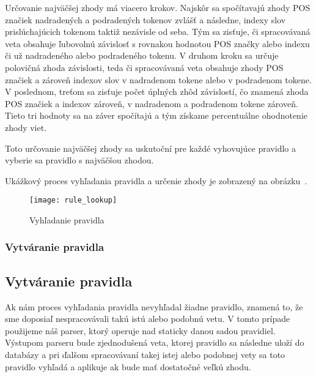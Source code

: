 Určovanie najväčšej zhody má viacero krokov. Najskôr sa spočítavajú zhody POS značiek nadradených a podradených tokenov zvlášť a následne, indexy slov prislúchajúcich tokenom taktiž nezávisle od seba. Tým sa zisťuje, či spracovávaná veta obsahuje ľubovolnú závislosť s rovnakou hodnotou POS značky alebo indexu či už nadradeného alebo podradeného tokenu. V druhom kroku sa určuje polovičná zhoda závislosti, teda či spracovávaná veta obsahuje zhody POS značiek a zároveň indexov slov v nadradenom tokene alebo v podradenom tokene. V poslednom, treťom sa zisťuje počet úplných zhôd závislostí, čo znamená zhoda POS značiek a indexov zároveň, v nadradenom a podradenom tokene zároveň. Tieto tri hodnoty sa na záver spočítajú a tým získame percentuálne ohodnotenie zhody viet.

Toto určovanie najväčšej zhody sa uskutoční pre každé vyhovujúce pravidlo a vyberie sa pravidlo s najväčšou zhodou.

Ukážkový proces vyhľadania pravidla a určenie zhody je zobrazený na obrázku~.

\begin{figure}[H]
	\begin{center}\texttt{[image: rule\_lookup]}\end{center}
	\caption[Vyhľadanie pravidla]{Vyhľadanie pravidla}\label{fig:rule_lookup}
\end{figure}

%
%
{
	\subsubsection{Vytváranie pravidla}
}
{
	\subsection{Vytváranie pravidla}
}
Ak nám proces vyhľadania pravidla nevyhľadal žiadne pravidlo, znamená to, že sme doposiaľ nespracovávali takú istú alebo podobnú vetu. V tomto prípade použijeme náš parser, ktorý operuje nad staticky danou sadou pravidiel. Výstupom parseru bude zjednodušená veta, ktorej pravidlo sa následne uloží do databázy a pri ďalšom spracovávaní takej istej alebo podobnej vety sa toto pravidlo vyhľadá a aplikuje ak bude mať dostatočné veľkú zhodu.

